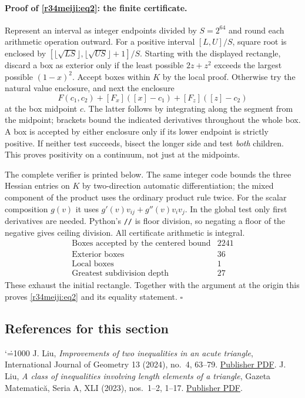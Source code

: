 \documentclass[11pt,a4paper]{article}
\makeatletter
\numberwithin{equation}{section}
\theoremstyle{definition}
\theoremstyle{remark}
\renewenvironment{thebibliography}[1]
 {\subsection*{References for this section}\small
  \list{\@biblabel{\@arabic\c@enumiv}}
       {\settowidth\labelwidth{\@biblabel{#1}}\leftmargin\labelwidth
        \advance\leftmargin\labelsep\@openbib@code
        \usecounter{enumiv}\let\p@enumiv\@empty
        \renewcommand\theenumiv{\@arabic\c@enumiv}}
  \sloppy\clubpenalty4000\widowpenalty4000\sfcode`\.=1000\relax}
 {\def\@noitemerr{\@latex@warning{Empty bibliography}}\endlist}
\makeatother
\begin{document}
\paragraph{Proof of \eqref{r34meiji:eq2}: the finite certificate.}
Represent an interval as integer endpoints divided by $S=2^{64}$ and round each arithmetic operation outward. For a positive interval $[L,U]/S$, square root is enclosed by
$[\lfloor\sqrt{LS}\rfloor,\lfloor\sqrt{US}\rfloor+1]/S$. Starting with the displayed rectangle, discard a box as exterior only if the least possible $2z+z^2$ exceeds the largest possible $(1-x)^2$. Accept boxes within $K$ by the local proof. Otherwise try the natural value enclosure, and next the enclosure
\[
 F(c_1,c_2)+[F_x]([x]-c_1)+[F_z]([z]-c_2)
\]
at the box midpoint $c$. The latter follows by integrating along the segment from the midpoint; brackets bound the indicated derivatives throughout the whole box. A box is accepted by either enclosure only if its lower endpoint is strictly positive. If neither test succeeds, bisect the longer side and test \emph{both} children. This proves positivity on a continuum, not just at the midpoints.

The complete verifier is printed below. The same integer code bounds the three Hessian entries on $K$ by two-direction automatic differentiation; the mixed component of the product uses the ordinary product rule twice. For the scalar composition $g(v)$ it uses $g'(v)v_{ij}+g''(v)v_i v_j$. In the global test only first derivatives are needed. Python's \texttt{//} is floor division, so negating a floor of the negative gives ceiling division. All certificate arithmetic is integral.
\[
\begin{array}{lr}
\text{Boxes accepted by the centered bound}&2241\\
\text{Exterior boxes}&36\\
\text{Local boxes}&1\\
\text{Greatest subdivision depth}&27
\end{array}
\]
These exhaust the initial rectangle. Together with the argument at the origin this proves \eqref{r34meiji:eq2} and its equality statement. \hfill$\square$

\begin{thebibliography}{9}
 J. Liu, \emph{Improvements of two inequalities in an acute triangle}, International Journal of Geometry 13 (2024), no.~4, 63--79. \href{https://ijgeometry.com/wp-content/uploads/2024/09/6.-63-79.pdf}{Publisher PDF}.
 J. Liu, \emph{A class of inequalities involving length elements of a triangle}, Gazeta Matematic\u{a}, Seria A, XLI (2023), nos.~1--2, 1--17. \href{https://ssmr.ro/gazeta/gma/2023/gma1-2-2023-continut.pdf}{Publisher PDF}.
\end{thebibliography}
\end{document}
